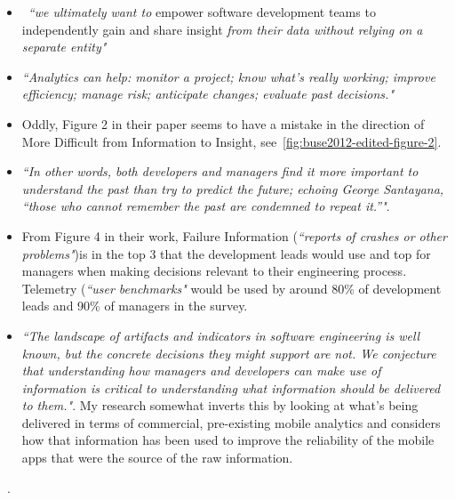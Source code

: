 \begin{itemize}
    \item ~\emph{``we ultimately want to} empower software development teams to independently gain and share insight \emph{from their data without relying on a separate entity"}
    \item \emph{``Analytics can help: monitor a project; know what's really working; improve efficiency; manage risk; anticipate changes; evaluate past decisions."}
    
    \item Oddly, Figure 2 in their paper seems to have a mistake in the direction of More Difficult from Information to Insight, see~\ref{fig:buse2012-edited-figure-2}.
    
    \item \emph{``In other words, both developers and managers find it more important to understand the past than try to predict the future; echoing George Santayana, “those who cannot remember the past are condemned to repeat it.”"}.
    
    \item From Figure 4 in their work, Failure Information (\emph{``reports of crashes or other problems"})is in the top 3 that the development leads would use and top for managers when making decisions relevant to their engineering process. Telemetry (\emph{``user benchmarks"} would be used by around 80\% of development leads and 90\% of managers in the survey.
    
    \item \emph{``The landscape of artifacts and indicators in software engineering is well known, but the concrete decisions they might support are not. We conjecture that understanding how managers and developers can make use of information is critical to understanding what information should be delivered to them."}. My research somewhat inverts this by looking at what's being delivered in terms of commercial, pre-existing mobile analytics and considers how that information has been used to improve the reliability of the mobile apps that were the source of the raw information.
    
\end{itemize}~\cite{buse2012_information_needs_for_software_development_analytics}.

